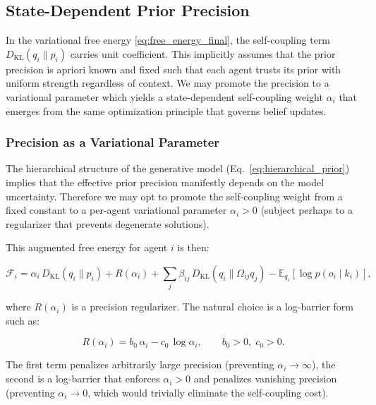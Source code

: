 \documentclass[twoside,11pt]{article}
\begin{document}
\subsection{State-Dependent Prior Precision}
\label{sec:state_dependent_precision}

In the variational free energy \eqref{eq:free_energy_final}, the self-coupling term $D_{\mathrm{KL}}(q_i \| p_i)$ carries unit coefficient. This implicitly assumes that the prior precision is apriori known and fixed such that each agent trusts its prior with uniform strength regardless of context. We may promote the precision to a variational parameter which yields a state-dependent self-coupling weight $\alpha_i$ that emerges from the same optimization principle that governs belief updates.

\subsubsection{Precision as a Variational Parameter}

The hierarchical structure of the generative model (Eq.~\ref{eq:hierarchical_prior}) implies that the effective prior precision manifestly depends on the model uncertainty. Therefore we may opt to promote the self-coupling weight from a fixed constant to a per-agent variational parameter $\alpha_i > 0$ (subject perhaps to a regularizer that prevents degenerate solutions).

This augmented free energy for agent $i$ is then:

\begin{equation}
\mathcal{F}_i = \alpha_i\,D_{\mathrm{KL}}(q_i \| p_i)
+ R(\alpha_i)
+ \sum_j \beta_{ij}\,D_{\mathrm{KL}}(q_i \| \Omega_{ij} q_j)
- \mathbb{E}_{q_i}[\log p(o_i \mid k_i)],
\label{eq:free_energy_adaptive}
\end{equation}

where $R(\alpha_i)$ is a precision regularizer. The natural choice is a log-barrier form such as:

\begin{equation}
R(\alpha_i) = b_0\,\alpha_i - c_0\,\log \alpha_i, \qquad b_0 > 0,\; c_0 > 0.
\label{eq:precision_regularizer}
\end{equation}

The first term penalizes arbitrarily large precision (preventing $\alpha_i \to \infty$),  the second is a log-barrier that enforces $\alpha_i > 0$ and penalizes vanishing precision (preventing $\alpha_i \to 0$, which would trivially eliminate the self-coupling cost). 
\end{document}
